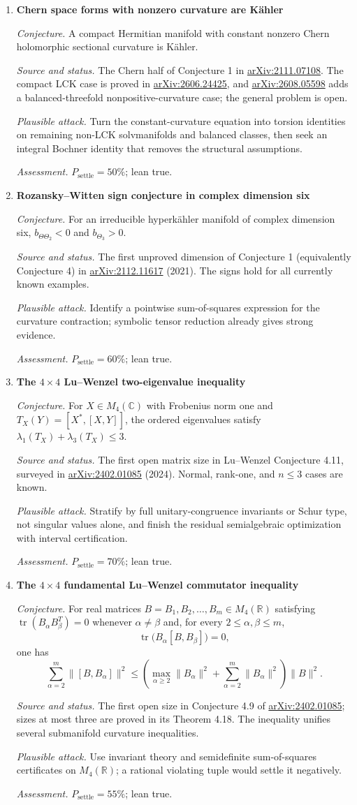 \documentclass[11pt]{article}
\newcommand{\cand}[5]{%
  \item \textbf{#1}\par
  \emph{Conjecture.} #2\par
  \emph{Source and status.} #3\par
  \emph{Plausible attack.} #4\par
  \emph{Assessment.} #5
}
\newcommand{\psettle}{P_{\mathrm{settle}}}
\begin{document}
\begin{enumerate}[label=\textbf{M\arabic*.}]
\cand{Chern space forms with nonzero curvature are K\"ahler}
{A compact Hermitian manifold with constant nonzero Chern holomorphic sectional curvature is K\"ahler.}
{The Chern half of Conjecture 1 in \href{https://arxiv.org/abs/2111.07108}{arXiv:2111.07108}.  The compact LCK case is proved in \href{https://arxiv.org/abs/2606.24425}{arXiv:2606.24425}, and \href{https://arxiv.org/abs/2608.05598}{arXiv:2608.05598} adds a balanced-threefold nonpositive-curvature case; the general problem is open.}
{Turn the constant-curvature equation into torsion identities on remaining non-LCK solvmanifolds and balanced classes, then seek an integral Bochner identity that removes the structural assumptions.}
{$\psettle=50\%$; lean true.}

\cand{Rozansky--Witten sign conjecture in complex dimension six}
{For an irreducible hyperk\"ahler manifold of complex dimension six, $b_{\Theta\Theta_2}<0$ and $b_{\Theta_3}>0$.}
{The first unproved dimension of Conjecture 1 (equivalently Conjecture 4) in \href{https://arxiv.org/abs/2112.11617}{arXiv:2112.11617} (2021).  The signs hold for all currently known examples.}
{Identify a pointwise sum-of-squares expression for the curvature contraction; symbolic tensor reduction already gives strong evidence.}
{$\psettle=60\%$; lean true.}

\cand{The $4\times4$ Lu--Wenzel two-eigenvalue inequality}
{For $X\in M_4(\mathbb C)$ with Frobenius norm one and $T_X(Y)=[X^*,[X,Y]]$, the ordered eigenvalues satisfy $\lambda_1(T_X)+\lambda_3(T_X)\le3$.}
{The first open matrix size in Lu--Wenzel Conjecture 4.11, surveyed in \href{https://arxiv.org/abs/2402.01085}{arXiv:2402.01085} (2024).  Normal, rank-one, and $n\le3$ cases are known.}
{Stratify by full unitary-congruence invariants or Schur type, not singular values alone, and finish the residual semialgebraic optimization with interval certification.}
{$\psettle=70\%$; lean true.}

\cand{The $4\times4$ fundamental Lu--Wenzel commutator inequality}
{For real matrices $B=B_1,B_2,\ldots,B_m\in M_4(\mathbb R)$ satisfying $\operatorname{tr}(B_\alpha B_\beta^T)=0$ whenever $\alpha\ne\beta$ and, for every $2\le\alpha,\beta\le m$,
\[\operatorname{tr}\bigl(B_\alpha[B,B_\beta]\bigr)=0,\]
one has
\[\sum_{\alpha=2}^m\|[B,B_\alpha]\|^2\le\left(\max_{\alpha\ge2}\|B_\alpha\|^2+\sum_{\alpha=2}^m\|B_\alpha\|^2\right)\|B\|^2.\]}
{The first open size in Conjecture 4.9 of \href{https://arxiv.org/abs/2402.01085}{arXiv:2402.01085}; sizes at most three are proved in its Theorem 4.18.  The inequality unifies several submanifold curvature inequalities.}
{Use invariant theory and semidefinite sum-of-squares certificates on $M_4(\mathbb R)$; a rational violating tuple would settle it negatively.}
{$\psettle=55\%$; lean true.}


\end{enumerate}
\end{document}
